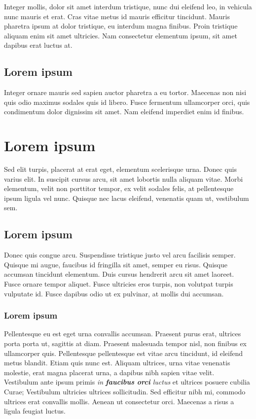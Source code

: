 Integer mollis, dolor sit amet interdum tristique, nunc dui eleifend leo, in vehicula nunc mauris et erat. Cras vitae metus id mauris efficitur tincidunt. Mauris pharetra ipsum at dolor tristique, eu interdum magna finibus. Proin tristique aliquam enim sit amet ultricies. Nam consectetur elementum ipsum, sit amet dapibus erat luctus at.

\subsection{Lorem ipsum}

Integer ornare mauris sed sapien auctor pharetra a eu tortor. Maecenas non nisi quis odio maximus sodales quis id libero. Fusce fermentum ullamcorper orci, quis condimentum dolor dignissim sit amet. Nam eleifend imperdiet enim id finibus.

\section{Lorem ipsum}

Sed elit turpis, placerat at erat eget, elementum scelerisque urna. Donec quis varius elit. In suscipit cursus arcu, sit amet lobortis nulla aliquam vitae. Morbi elementum, velit non porttitor tempor, ex velit sodales felis, at pellentesque ipsum ligula vel nunc. Quisque nec lacus eleifend, venenatis quam ut, vestibulum sem.

\subsection{Lorem ipsum}

Donec quis congue arcu. Suspendisse tristique justo vel arcu facilisis semper. Quisque mi augue, faucibus id fringilla sit amet, semper eu risus. Quisque accumsan tincidunt elementum. Duis cursus hendrerit arcu sit amet laoreet. Fusce ornare tempor aliquet. Fusce ultricies eros turpis, non volutpat turpis vulputate id. Fusce dapibus odio ut ex pulvinar, at mollis dui accumsan. 

\subsubsection{Lorem ipsum}

Pellentesque eu est eget urna convallis accumsan. Praesent purus erat, ultrices porta porta ut, sagittis at diam. Praesent malesuada tempor nisl, non finibus ex ullamcorper quis. Pellentesque pellentesque est vitae arcu tincidunt, id eleifend metus blandit. Etiam quis nunc est. Aliquam ultrices, urna vitae venenatis molestie, erat magna placerat urna, a dapibus nibh sapien vitae velit.
\\
Vestibulum ante ipsum primis \textit{in \textbf{faucibus orci} luctus} et ultrices posuere cubilia Curae; Vestibulum ultricies ultrices sollicitudin. Sed efficitur nibh mi, commodo ultrices erat convallis mollis. Aenean ut consectetur orci. Maecenas a risus a ligula feugiat luctus. 


